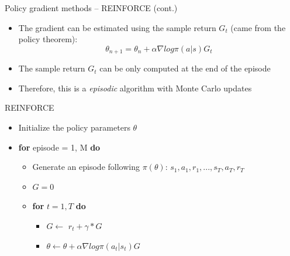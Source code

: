 \documentclass[presentation, 9pt]{beamer}\mode<presentation>{\usetheme{AMSBolognaFC}}
\begin{document}
\begin{frame}{Policy gradient methods -- REINFORCE (cont.)}
\begin{itemize}
	\item The gradient can be estimated using the sample return $G_t$ (came from the policy theorem):
	\begin{equation*}
		\theta_{n+1} = \theta_{n} + \alpha \nabla log \pi(a | s) G_t
	\end{equation*}
	\item The sample return $G_t$ can be only computed at the end of the episode
	\item Therefore, this is a \emph{episodic} algorithm with Monte Carlo updates
	
\end{itemize}
\begin{exampleblock}{REINFORCE}
	\begin{itemize}
		\item Initialize the policy parameters $\theta$
		\item \textbf{for} episode = 1, M \textbf{do}
		\begin{itemize}
			\item Generate an episode following $\pi(\theta)$: $s_1, a_1, r_1, ..., s_T, a_T, r_T$
			\item $ G = 0 $
			\item \textbf{for} $t = 1, T$ \textbf{do}
			\begin{itemize}
				\item $G \leftarrow$ $r_t + \gamma * G$
				\item $\theta \leftarrow \theta + \alpha \nabla log \pi(a_t | s_t) G$
			\end{itemize}
		\end{itemize}
	\end{itemize}
\end{exampleblock}
\end{frame}
\end{document}
